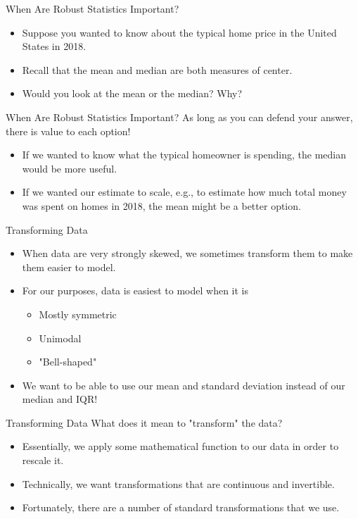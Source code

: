 \begin{frame}{When Are Robust Statistics Important?}
    \begin{itemize}
        \item Suppose you wanted to know about the typical home price in the United States in 2018.
        \item Recall that the mean and median are both measures of center.
        \item Would you look at the mean or the median? Why?
    \end{itemize}
\end{frame}

\begin{frame}{When Are Robust Statistics Important?}
    As long as you can defend your answer, there is value to each option!
    \begin{itemize}
        \item If we wanted to know what the typical homeowner is spending, the median would be more useful.
        \item If we wanted our estimate to scale, e.g., to estimate how much total money was spent on homes in 2018, the mean might be a better option. 
    \end{itemize}
\end{frame}

\begin{frame}{Transforming Data}
    \begin{itemize}
        \item When data are very strongly skewed, we sometimes transform them to make them easier to model.
        \item For our purposes, data is easiest to model when it is 
        \begin{itemize}
            \item Mostly symmetric
            \item Unimodal
            \item "Bell-shaped"
        \end{itemize}
        \item We want to be able to use our mean and standard deviation instead of our median and IQR!
    \end{itemize}
\end{frame}

\begin{frame}{Transforming Data}
    What does it mean to "transform" the data?
    \begin{itemize}
        \item Essentially, we apply some mathematical function to our data in order to rescale it.
        \item Technically, we want transformations that are continuous and invertible.
        \item Fortunately, there are a number of standard transformations that we use. 
    \end{itemize}
\end{frame}


